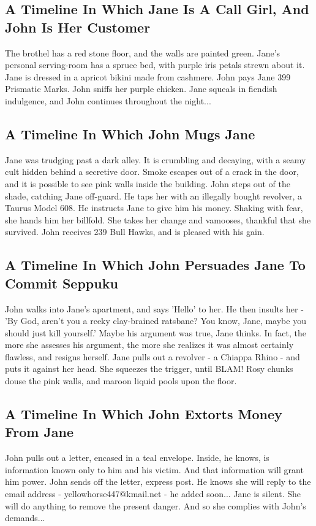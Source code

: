 \documentclass{article}
\begin{document}
\subsection{A Timeline In Which Jane Is A Call Girl, And John Is Her Customer}


The brothel has a red stone floor, and the walls are painted green.
Jane's personal serving{-}room has a spruce bed, with purple iris petals strewn about it.
Jane is dressed in a apricot bikini made from cashmere.
John pays Jane 399 Prismatic Marks.
John sniffs her purple chicken.
Jane squeals in fiendish indulgence, and John continues throughout the night...
\subsection{A Timeline In Which John Mugs Jane}


Jane was trudging past a dark alley.
It is crumbling and decaying, with a seamy cult hidden behind a secretive door.
Smoke escapes out of a crack in the door, and it is possible to see pink walls inside the building.
John steps out of the shade, catching Jane off{-}guard.
He taps her with an illegally bought revolver, a Taurus Model 608.
He instructs Jane to give him his money.
Shaking with fear, she hands him her billfold.
She takes her change and vamooses, thankful that she survived.
John receives 239 Bull Hawks, and is pleased with his gain.
\subsection{A Timeline In Which John Persuades Jane To Commit Seppuku}


John walks into Jane's apartment, and says 'Hello' to her.
He then insults her {-} 'By God, aren't you a reeky clay{-}brained ratsbane?
You know, Jane, maybe you should just kill yourself.'
Maybe his argument was true, Jane thinks.
In fact, the more she assesses his argument, the more she realizes it was almost certainly flawless, and resigns herself.
Jane pulls out a revolver {-} a Chiappa Rhino {-} and puts it against her head.
She squeezes the trigger, until BLAM!
Rosy chunks douse the pink walls, and maroon liquid pools upon the floor.
\subsection{A Timeline In Which John Extorts Money From Jane}


John pulls out a letter, encased in a teal envelope. Inside, he knows, is information known only to him and his victim. And that information will grant him power.
John sends off the letter, express post. He knows she will reply to the email address {-} yellowhorse447@kmail.net {-} he added soon...
Jane is silent. She will do anything to remove the present danger. And so she complies with John's demands...
\end{document}

